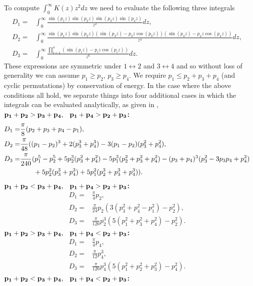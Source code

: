 \begin{subappendices}
To compute $\int_0^\infty K(z) z^2 dz$ we need to evaluate the following three integrals
\begin{align}
D_1=&\int_0^\infty \frac{\sin(p_1z)\sin(p_2z)\sin(p_3z)\sin(p_4z)}{z^2}dz,\\
D_2=&\int_0^\infty\frac{\sin(p_1z)\sin(p_2z)(\sin(p_3z)-p_3z\cos(p_3z))(\sin(p_4z)-p_4z\cos(p_4z))}{z^4}dz,\\
D_3=&\int_0^\infty\frac{\prod_{i=1}^4(\sin(p_iz)-p_iz\cos(p_iz))}{z^6}dz.
\end{align}
These expressions are symmetric under $1\leftrightarrow 2$ and $3\leftrightarrow 4$ and so without loss of generality we can assume $p_1\geq p_2$, $p_3\geq p_4$. We require $p_1\leq p_2+p_3+p_4$ (and cyclic permutations) by conservation of energy.  In the case where the above conditions all hold, we separate things into four additional cases in which the integrals can be evaluated analytically, as given in \cite{Dolgov_Hansen},\\
${\bf p_1+p_2>p_3+p_4\text{, \hspace{1mm} }p_1+p_4>p_2+p_3}${\bf :}
\begin{align}
D_1=&\frac{\pi}{8}(p_2+p_3+p_4-p_1),\\
D_2=&\frac{\pi}{48}((p_1-p_2)^3+2(p_3^3+p_4^3)-3(p_1-p_2)(p_3^2+p_4^2),\\
D_3=&\frac{\pi}{240}(p_1^5-p_2^5+5p_2^3(p_3^2+p_4^2)-5p_1^3(p_2^2+p_3^2+p_4^2)-(p_3+p_4)^3(p_3^2-3p_3p_4+p_4^2)\notag\\
&\hspace{7mm}+5p_2^2(p_3^3+p_4^3)+5p_1^2(p_2^3+p_3^3+p_4^3)).
\end{align}
${\bf p_1+p_2<p_3+p_4\text{, \hspace{1mm} }p_1+p_4>p_2+p_3}${\bf :}
\begin{align}
D_1=&\frac{\pi }{4}p_2,\\
D_2=&\frac{\pi }{24}p_2(3(p_3^2+p_4^2-p_1^2)-p_2^2),\\
D_3=&\frac{\pi}{120}p_2^3(5(p_1^2+p_3^2+p_4^2)-p_2^2).
\end{align}
${\bf p_1+p_2>p_3+p_4\text{, \hspace{1mm} }p_1+p_4<p_2+p_3}${\bf :}
\begin{align}
D_1=&\frac{\pi }{4}p_4,\\
D_2=&\frac{\pi}{12} p_4^3,\\
D_3=&\frac{\pi }{120}p_4^3(5(p_1^2+p_2^2+p_3^2)-p_4^2).
\end{align}
${\bf p_1+p_2<p_3+p_4\text{, \hspace{1mm} }p_1+p_4<p_2+p_3}${\bf :}

\end{subappendices}
